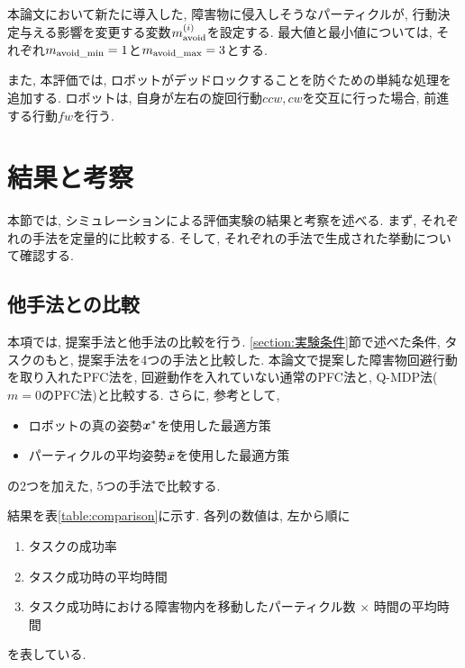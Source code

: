 本論文において新たに導入した, 障害物に侵入しそうなパーティクルが, 行動決定与える影響を変更する変数$m^{(i)}_{\rm avoid}$を設定する. 
最大値と最小値については, それぞれ$m_{\rm avoid\_min} = 1$と$m_{\rm avoid\_max} = 3$とする. 

また, 本評価では, ロボットがデッドロックすることを防ぐための単純な処理を追加する. 
ロボットは, 自身が左右の旋回行動$ccw, cw$を交互に行った場合, 前進する行動$fw$を行う. 


\section{結果と考察} \label{section:結果}
本節では, シミュレーションによる評価実験の結果と考察を述べる. 
まず, それぞれの手法を定量的に比較する. 
そして, それぞれの手法で生成された挙動について確認する. 

\subsection{他手法との比較}
本項では, 提案手法と他手法の比較を行う. 
\ref{section:実験条件}節で述べた条件, タスクのもと, 提案手法を4つの手法と比較した. 
本論文で提案した障害物回避行動を取り入れたPFC法を, 
回避動作を入れていない通常のPFC法と, Q-MDP法($m=0$のPFC法)と比較する. 
さらに, 参考として, 
\begin{itemize}
  \item ロボットの真の姿勢$\boldsymbol{x}^{*}$を使用した最適方策
  \item パーティクルの平均姿勢$\bar{\boldsymbol{x}}$を使用した最適方策
\end{itemize}
の2つを加えた, 5つの手法で比較する. 

結果を表\ref{table:comparison}に示す. 
各列の数値は, 左から順に
\begin{enumerate}
  \item タスクの成功率
  \item タスク成功時の平均時間
  \item タスク成功時における障害物内を移動したパーティクル数 $\times$ 時間の平均時間
\end{enumerate}
を表している. 

